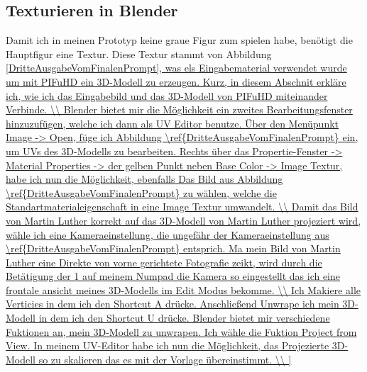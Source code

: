 \subsection{Texturieren in Blender}

Damit ich in meinen Prototyp keine graue Figur zum spielen habe, benötigt die Hauptfigur eine Textur. Diese Textur stammt von Abbildung \ref{DritteAusgabeVomFinalenPrompt], was els Eingabematerial verwendet wurde um mit PIFuHD ein 3D-Modell zu erzeugen. Kurz, in diesem Abschnit erkläre ich, wie ich das Eingabebild und das 3D-Modell von PIFuHD miteinander Verbinde.
\\
Blender bietet mir die Möglichkeit ein zweites Bearbeitungsfenster hinzuzufügen, welche ich dann als UV Editor benutze. Über den Menüpunkt Image -> Open, füge ich Abbildung \ref{DritteAusgabeVomFinalenPrompt} ein, um UVs des 3D-Modells zu bearbeiten. Rechts über das Propertie-Fenster -> Material Properties -> der gelben Punkt neben Base Color -> Image Textur, habe ich nun die Möglichkeit, ebenfalls Das Bild aus Abbildung \ref{DritteAusgabeVomFinalenPrompt} zu wählen, welche die Standartmaterialeigenschaft in eine Image Textur umwandelt.
\\
Damit das Bild von Martin Luther korrekt auf das 3D-Modell von Martin Luther projeziert wird, wähle ich eine Kameraeinstellung, die ungefähr der Kameraeinstellung aus \ref{DritteAusgabeVomFinalenPrompt} entsprich. Ma mein Bild von Martin Luther eine Direkte von vorne gerichtete Fotografie zeikt, wird durch die Betätigung der 1 auf meinem Numpad die Kamera so eingestellt das ich eine frontale ansicht meines 3D-Modells im Edit Modus bekomme.
\\
Ich Makiere alle Verticies in dem ich den Shortcut A drücke. Anschließend Unwrape ich mein 3D-Modell in dem ich den Shortcut U drücke. Blender bietet mir verschiedene Fuktionen an, mein 3D-Modell zu unwrapen. Ich wähle die Fuktion Project from View. In meinem UV-Editor habe ich nun die Möglichkeit, das Projezierte 3D-Modell so zu skalieren das es mit der Vorlage übereinstimmt.
\\
}
